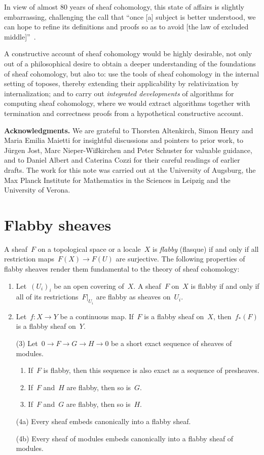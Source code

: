 \documentclass[oneside]{amsart}
\theoremstyle{definition}
\theoremstyle{plain}
\theoremstyle{remark}
\renewcommand{\_}{\mathpunct{.}\,}
\begin{document}
In view of almost 80 years of sheaf cohomology, this state of affairs is
slightly embarrassing, challenging the call that ``once [a] subject is better
understood, we can hope to refine its definitions and proofs so as to
avoid [the law of excluded middle]''~\cite[Section~3.4]{hott}.

A constructive account of sheaf cohomology would be highly desirable, not only
out of a philosophical desire to obtain a deeper understanding of the
foundations of sheaf cohomology, but also to: use the tools of sheaf cohomology
in the internal setting of toposes, thereby extending their applicability by
relativization by internalization; and to carry out \emph{integrated
developments} of algorithms for computing sheaf cohomology, where we would
extract algorithms together with termination and correctness proofs from a
hypothetical constructive account.


\textbf{Acknowledgments.} We are grateful to Thorsten Altenkirch, Simon Henry
and Maria Emilia Maietti for insightful discussions and pointers to prior work,
to Jürgen Jost, Marc Nieper-Wißkirchen and Peter Schuster for valuable
guidance, and to Daniel Albert and Caterina Cozzi for their careful readings of
earlier drafts. The work for this note was carried out at the University of
Augsburg, the Max Planck Institute for Mathematics in the Sciences in
Leipzig and the University of Verona.


\section{Flabby sheaves}

A sheaf~$F$ on a topological space or a locale~$X$ is \emph{flabby} (flasque) if and only
if all restriction maps~$F(X) \to F(U)$ are surjective. The following
properties of flabby sheaves render them fundamental to the theory of sheaf
cohomology:
\begin{enumerate}
\item Let~$(U_i)_i$ be an open covering of~$X$.
A sheaf~$F$ on~$X$ is flabby if and only if all of its restrictions~$F|_{U_i}$
are flabby as sheaves on~$U_i$.
\item Let~$f : X \to Y$ be a continuous map. If~$F$ is a flabby sheaf on~$X$,
then~$f_*(F)$ is a flabby sheaf on~$Y$.
\item[(3)] Let~$0 \to F \to G \to H \to 0$ be a short exact sequence of sheaves of
modules.
\begin{enumerate}
\item If~$F$ is flabby, then this sequence is also exact as a sequence of
presheaves.
\item If~$F$ and~$H$ are flabby, then so is~$G$.
\item If~$F$ and~$G$ are flabby, then so is~$H$.
\end{enumerate}
\item[(4a)] Every sheaf embeds canonically into a flabby sheaf.
\item[(4b)] Every sheaf of modules embeds canonically into a flabby sheaf of modules.
\end{enumerate}
\end{document}
